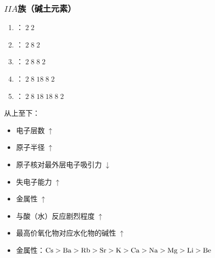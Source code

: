 \documentclass[a4paper]{article}
\begin{document}
	\subsubsection{$IIA$族（碱土元素）}
	\begin{minipage}{0.48\linewidth}
		\begin{enumerate}
			\item {}：$\;2\;2$
			\item {}：$\;2\;8\;2$
			\item {}：$\;2\;8\;8\;2$
			\item {}：$\;2\;8\;18\;8\;2$
			\item {}：$\;2\;8\;18\;18\;8\;2$
		\end{enumerate}
	\end{minipage}
	\hfill
	\begin{minipage}{.48\linewidth}
		从上至下：
		\begin{itemize}
			\item 电子层数$\;\uparrow$
			\item 原子半径$\;\uparrow$
			\item 原子核对最外层电子吸引力$\;\downarrow$
			\item 失电子能力$\;\uparrow$
			\item 金属性$\;\uparrow$
			\item 与酸（水）反应剧烈程度$\;\uparrow$
			\item 最高价氧化物对应水化物的碱性$\;\uparrow$
		\end{itemize}
	\end{minipage}
	\begin{itemize}
		\item 金属性：$\ce{Cs}>\ce{Ba}>\ce{Rb}>\ce{Sr}>\ce{K}>\ce{Ca}>\ce{Na}>\ce{Mg}>\ce{Li}>\ce{Be}$
	\end{itemize}
	
\end{document}
